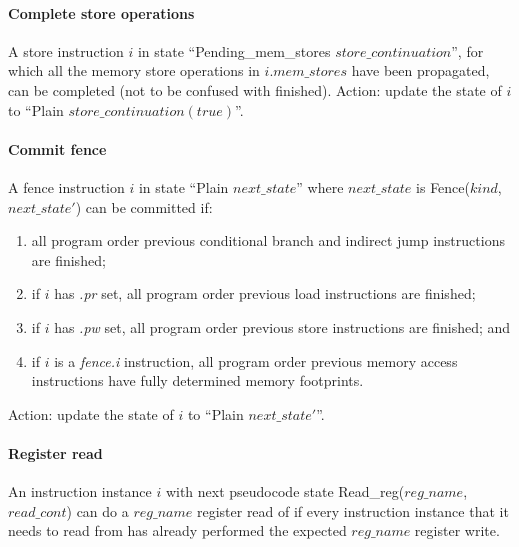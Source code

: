 \paragraph{Complete store operations}\label{omm:thread:complete_stores}
A store instruction $i$ in state ``{\sc Pending\_mem\_stores} $store\_continuation$'', for which all the memory store operations in $i.mem\_stores$ have been propagated, can be completed (not to be confused with finished).
Action: update the state of $i$ to ``{\sc Plain} $store\_continuation(true)$''.


\paragraph{Commit fence}\label{omm:thread:commit_barrier}
A fence instruction $i$ in state ``{\sc Plain} $next\_state$'' where $next\_state$ is {\sc Fence}($kind$, $next\_state'$) can be committed if:
\begin{enumerate}
\item all program order previous conditional branch and indirect jump instructions are finished;
\item if $i$ has {\em .pr} set, all program order previous load instructions are finished;
\item if $i$ has {\em .pw} set, all program order previous store instructions are finished; and
\item if $i$ is a {\em fence.i} instruction, all program order previous memory access instructions have fully determined memory footprints. 
\end{enumerate}
Action: update the state of $i$ to ``{\sc Plain} $next\_state'$''.


\paragraph{Register read}\label{omm:thread:reg_read}
An instruction instance $i$ with next pseudocode state {\sc Read\_reg}($reg\_name$, $read\_cont$) can do a $reg\_name$ register read of if every instruction instance that it needs to read from has already performed the expected $reg\_name$ register write.

